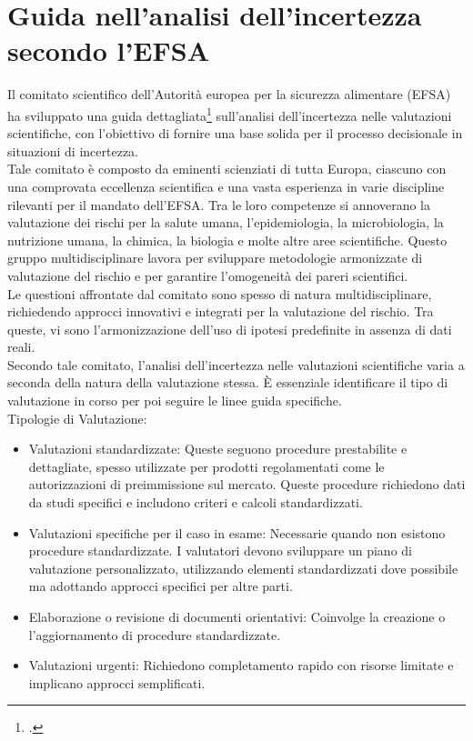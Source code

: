 \section{Guida nell'analisi dell'incertezza secondo l'EFSA}
Il comitato scientifico dell'Autorità europea per la sicurezza alimentare (EFSA) ha sviluppato una guida dettagliata\footcite{womak:guida-analisi-incertezza} sull'analisi dell'incertezza nelle valutazioni scientifiche, con l'obiettivo di fornire una base solida per il processo decisionale in situazioni di incertezza.\\
Tale comitato è composto da eminenti scienziati di tutta Europa, ciascuno con una comprovata eccellenza scientifica e una vasta esperienza in varie discipline rilevanti per il mandato dell'EFSA. Tra le loro competenze si annoverano la valutazione dei rischi per la salute umana, l'epidemiologia, la microbiologia, la nutrizione umana, la chimica, la biologia e molte altre aree scientifiche. Questo gruppo multidisciplinare lavora per sviluppare metodologie armonizzate di valutazione del rischio e per garantire l'omogeneità dei pareri scientifici.\\
Le questioni affrontate dal comitato sono spesso di natura multidisciplinare, richiedendo approcci innovativi e integrati per la valutazione del rischio. Tra queste, vi sono l'armonizzazione dell'uso di ipotesi predefinite in assenza di dati reali.\\

Secondo tale comitato, l'analisi dell'incertezza nelle valutazioni scientifiche varia a seconda della natura della valutazione stessa. È essenziale identificare il tipo di valutazione in corso per poi seguire le linee guida specifiche.\\

\noindent Tipologie di Valutazione:
\begin{itemize}
    \item Valutazioni standardizzate: Queste seguono procedure prestabilite e dettagliate, spesso utilizzate per prodotti regolamentati come le autorizzazioni di preimmissione sul mercato. Queste procedure richiedono dati da studi specifici e includono criteri e calcoli standardizzati.
    \item  Valutazioni specifiche per il caso in esame: Necessarie quando non esistono procedure standardizzate. I valutatori devono sviluppare un piano di valutazione personalizzato, utilizzando elementi standardizzati dove possibile ma adottando approcci specifici per altre parti.
    \item  Elaborazione o revisione di documenti orientativi: Coinvolge la creazione o l'aggiornamento di procedure standardizzate.
    \item  Valutazioni urgenti: Richiedono completamento rapido con risorse limitate e implicano approcci semplificati.
    
\end{itemize}

